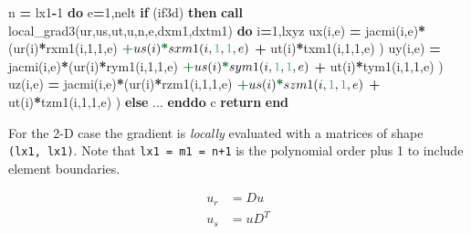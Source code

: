 \documentclass[
]{scrartcl}
\newenvironment{Shaded}{}{}
\newcommand{\DecValTok}[1]{\textcolor[rgb]{0.25,0.63,0.44}{#1}}
\newcommand{\KeywordTok}[1]{\textcolor[rgb]{0.00,0.44,0.13}{\textbf{#1}}}
\newcommand{\NormalTok}[1]{#1}
\begin{document}
\begin{Shaded}
\begin{Highlighting}[]
\NormalTok{       n }\KeywordTok{=}\NormalTok{ lx1}\KeywordTok{{-}}\DecValTok{1}
       \KeywordTok{do}\NormalTok{ e}\KeywordTok{=}\DecValTok{1}\NormalTok{,nelt}
          \KeywordTok{if}\NormalTok{ (if3d) }\KeywordTok{then}
             \KeywordTok{call}\NormalTok{ local\_grad3(ur,us,ut,u,n,e,dxm1,dxtm1)}
             \KeywordTok{do}\NormalTok{ i}\KeywordTok{=}\DecValTok{1}\NormalTok{,lxyz}
\NormalTok{                ux(i,e) }\KeywordTok{=}\NormalTok{ jacmi(i,e)}\KeywordTok{*}\NormalTok{(ur(i)}\KeywordTok{*}\NormalTok{rxm1(i,}\DecValTok{1}\NormalTok{,}\DecValTok{1}\NormalTok{,e)}
\NormalTok{      $                             }\KeywordTok{+}\NormalTok{ us(i)}\KeywordTok{*}\NormalTok{sxm1(i,}\DecValTok{1}\NormalTok{,}\DecValTok{1}\NormalTok{,e)}
\NormalTok{      $                             }\KeywordTok{+}\NormalTok{ ut(i)}\KeywordTok{*}\NormalTok{txm1(i,}\DecValTok{1}\NormalTok{,}\DecValTok{1}\NormalTok{,e) )}
\NormalTok{                uy(i,e) }\KeywordTok{=}\NormalTok{ jacmi(i,e)}\KeywordTok{*}\NormalTok{(ur(i)}\KeywordTok{*}\NormalTok{rym1(i,}\DecValTok{1}\NormalTok{,}\DecValTok{1}\NormalTok{,e)}
\NormalTok{      $                             }\KeywordTok{+}\NormalTok{ us(i)}\KeywordTok{*}\NormalTok{sym1(i,}\DecValTok{1}\NormalTok{,}\DecValTok{1}\NormalTok{,e)}
\NormalTok{      $                             }\KeywordTok{+}\NormalTok{ ut(i)}\KeywordTok{*}\NormalTok{tym1(i,}\DecValTok{1}\NormalTok{,}\DecValTok{1}\NormalTok{,e) )}
\NormalTok{                uz(i,e) }\KeywordTok{=}\NormalTok{ jacmi(i,e)}\KeywordTok{*}\NormalTok{(ur(i)}\KeywordTok{*}\NormalTok{rzm1(i,}\DecValTok{1}\NormalTok{,}\DecValTok{1}\NormalTok{,e)}
\NormalTok{      $                             }\KeywordTok{+}\NormalTok{ us(i)}\KeywordTok{*}\NormalTok{szm1(i,}\DecValTok{1}\NormalTok{,}\DecValTok{1}\NormalTok{,e)}
\NormalTok{      $                             }\KeywordTok{+}\NormalTok{ ut(i)}\KeywordTok{*}\NormalTok{tzm1(i,}\DecValTok{1}\NormalTok{,}\DecValTok{1}\NormalTok{,e) )}
          \KeywordTok{else}
\NormalTok{             ...}
       \KeywordTok{enddo}
\NormalTok{ c}
       \KeywordTok{return}
       \KeywordTok{end}
\end{Highlighting}
\end{Shaded}

For the 2-D case the gradient is \emph{locally} evaluated with a
matrices of shape \texttt{(lx1,\ lx1)}. Note that
\texttt{lx1\ =\ m1\ =\ n+1} is the polynomial order plus 1 to include
element boundaries.

\begin{align}
u_r &= D  u \\
u_s &= u D^T
\end{align}
\end{document}
